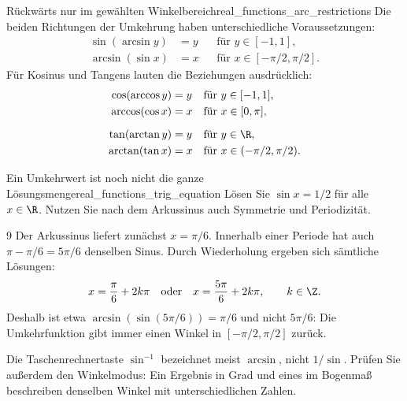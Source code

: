 \begin{KeyPointBox}{Rückwärts nur im gewählten Winkelbereich}{real_functions_arc_restrictions}
  Die beiden Richtungen der Umkehrung haben unterschiedliche Voraussetzungen:
  \[
    \begin{aligned}
      \sin(\arcsin y)&=y&&\text{für }y\in[-1,1],\\
      \arcsin(\sin x)&=x&&\text{für }x\in[-\pi/2,\pi/2].
    \end{aligned}
  \]
  Für Kosinus und Tangens lauten die Beziehungen ausdrücklich:
  \[
    \begin{aligned}
      \cos(\arccos y)&=y&&\text{für }y\in[-1,1],\\
      \arccos(\cos x)&=x&&\text{für }x\in[0,\pi],\\[0.6em]
      \tan(\arctan y)&=y&&\text{für }y\in\R,\\
      \arctan(\tan x)&=x&&\text{für }x\in(-\pi/2,\pi/2).
    \end{aligned}
  \]
\end{KeyPointBox}
\begin{ExampleBox}{Ein Umkehrwert ist noch nicht die ganze Lösungsmenge}{real_functions_trig_equation}
  Lösen Sie $\sin x=1/2$ für alle $x\in\R$.
  Nutzen Sie nach dem Arkussinus auch Symmetrie und Periodizität.
  \begin{ClozeArea}[34]{9}
    Der Arkussinus liefert zunächst $x=\pi/6$.
    Innerhalb einer Periode hat auch $\pi-\pi/6=5\pi/6$ denselben Sinus.
    Durch Wiederholung ergeben sich sämtliche Lösungen:
    \[
      x=\frac\pi6+2k\pi
      \quad\text{oder}\quad
      x=\frac{5\pi}6+2k\pi,\qquad k\in\Z.
    \]
    Deshalb ist etwa $\arcsin(\sin(5\pi/6))=\pi/6$ und nicht $5\pi/6$:
    Die Umkehrfunktion gibt immer einen Winkel in $[-\pi/2,\pi/2]$ zurück.
  \end{ClozeArea}
\end{ExampleBox}
\begin{RemarkBox}[remark title=Arkusfunktionen am Taschenrechner]
  Die Taschenrechnertaste $\sin^{-1}$ bezeichnet meist $\arcsin$,
  nicht $1/\sin$. Prüfen Sie außerdem den Winkelmodus:
  Ein Ergebnis in Grad und eines im Bogenmaß beschreiben denselben
  Winkel mit unterschiedlichen Zahlen.
\end{RemarkBox}

